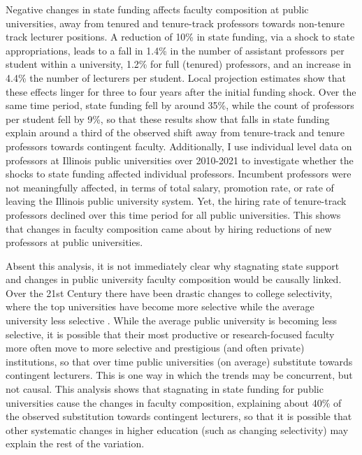 Negative changes in state funding affects faculty composition at public universities, away from tenured and tenure-track professors towards non-tenure track lecturer positions.
A reduction of 10\% in state funding, via a shock to state appropriations, leads to a fall in 1.4\% in the number of assistant professors per student within a university, 1.2\% for full (tenured) professors, and an increase in 4.4\% the number of lecturers per student.
Local projection estimates show that these effects linger for three to four years after the initial funding shock.
Over the same time period, state funding fell by around 35\%, while the count of professors per student fell by 9\%, so that these results show that falls in state funding explain around a third of the observed shift away from tenure-track and tenure professors towards contingent faculty.
Additionally, I use individual level data on professors at Illinois public universities over 2010-2021 to investigate whether the shocks to state funding affected individual professors.
Incumbent professors were not meaningfully affected, in terms of total salary, promotion rate, or rate of leaving the Illinois public university system.
Yet, the hiring rate of tenure-track professors declined over this time period for all public universities.
This shows that changes in faculty composition came about by hiring reductions of new professors at public universities.

Absent this analysis, it is not immediately clear why stagnating state support and changes in public university faculty composition would be causally linked.
Over the 21st Century there have been drastic changes to college selectivity, where the top universities have become more selective while the average university less selective \citep{hoxby2009changing}.
While the average public university is becoming less selective, it is possible that their most productive or research-focused faculty more often move to more selective and prestigious (and often private) institutions, so that over time public universities (on average) substitute towards contingent lecturers. 
This is one way in which the trends may be concurrent, but not causal.
This analysis shows that stagnating in state funding for public universities cause the changes in faculty composition, explaining about 40\% of the observed substitution towards contingent lecturers, so that it is possible that other systematic changes in higher education (such as changing selectivity) may explain the rest of the variation.

